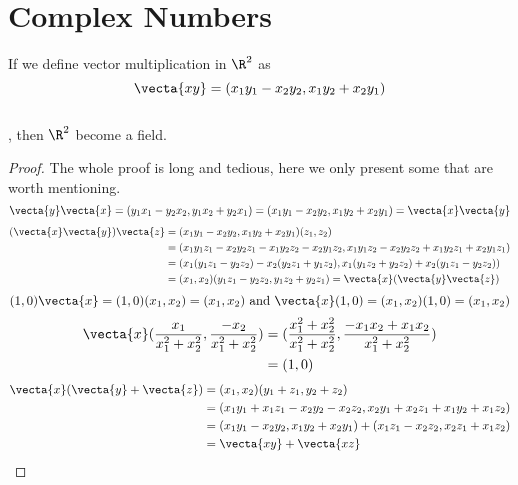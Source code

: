 \documentclass{report}
\begin{document}
\section{Complex Numbers}
\begin{theorem}
\label{1.6.1}
If we define vector multiplication in $\R^2$  as
 \begin{equation*}
 \vecta{xy}=(x_1y_1-x_2y_2,x_1y_2+x_2y_1)
\end{equation*}\\
, then $\R^2$ become a field.
\end{theorem}
\begin{proof}
The whole proof is long and tedious, here we only present some that are worth mentioning.\\
\begin{equation*}
\vecta{y}\vecta{x}=(y_1x_1-y_2x_2,y_1x_2+y_2x_1)=(x_1y_1-x_2y_2,x_1y_2+x_2y_1)=\vecta{x}\vecta{y}
\end{equation*}
\begin{align*}
  (\vecta{x}\vecta{y})\vecta{z}&=(x_1y_1-x_2y_2,x_1y_2+x_2y_1)(z_1,z_2)\\
  &=(x_1y_1z_1-x_2y_2z_1-x_1y_2z_2-x_2y_1z_2,x_1y_1z_2-x_2y_2z_2+x_1y_2z_1+x_2y_1z_1)\\
  &=(x_1(y_1z_1-y_2z_2)-x_2(y_2z_1+y_1z_2),x_1(y_1z_2+y_2z_2)+x_2(y_1z_1-y_2z_2))\\
  &=(x_1,x_2)(y_1z_1-y_2z_2,y_1z_2+y_2z_1)=\vecta{x}(\vecta{y}\vecta{z})
\end{align*}
\begin{equation*}
  (1,0)\vecta{x}=(1,0)(x_1,x_2)=(x_1,x_2)\text{ and }\vecta{x}(1,0)=(x_1,x_2)(1,0)=(x_1,x_2)
\end{equation*}
\begin{align*}
\vecta{x}(\frac{x_1}{x_1^2+x_2^2},\frac{-x_2}{x_1^2+x_2^2})&=(\frac{x_1^2+x_2^2}{x_1^2+x_2^2},\frac{-x_1x_2+x_1x_2}{x_1^2+x_2^2})\\
&=(1,0)
\end{align*}
\begin{align*}
\vecta{x}(\vecta{y}+\vecta{z})&=(x_1,x_2)(y_1+z_1,y_2+z_2)\\
&=(x_1y_1+x_1z_1-x_2y_2-x_2z_2,x_2y_1+x_2z_1+x_1y_2+x_1z_2)\\
&=(x_1y_1-x_2y_2,x_1y_2+x_2y_1)+(x_1z_1-x_2z_2,x_2z_1+x_1z_2)\\
&=\vecta{xy}+\vecta{xz}
\end{align*}
\end{proof}
\end{document}
